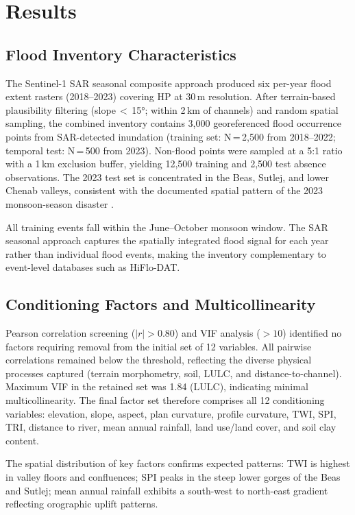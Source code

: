 \section{Results}
\label{sec:results}

\subsection{Flood Inventory Characteristics}
\label{sec:results_inventory}

The Sentinel-1 SAR seasonal composite approach produced six per-year flood extent
rasters (2018--2023) covering HP at 30\,m resolution.
After terrain-based plausibility filtering (slope\,$<$\,15°; within 2\,km of channels)
and random spatial sampling, the combined inventory contains 3,000 georeferenced
flood occurrence points from SAR-detected inundation
(training set: N\,=\,2,500 from 2018--2022; temporal test: N\,=\,500 from 2023).
Non-flood points were sampled at a 5:1 ratio with a 1\,km exclusion buffer,
yielding 12,500 training and 2,500 test absence observations.
The 2023 test set is concentrated in the Beas, Sutlej,
and lower Chenab valleys, consistent with the documented spatial pattern
of the 2023 monsoon-season disaster \citep{ndma2023}.

All training events fall within the June--October monsoon window.
The SAR seasonal approach captures the spatially integrated flood signal
for each year rather than individual flood events, making the inventory
complementary to event-level databases such as HiFlo-DAT.

\subsection{Conditioning Factors and Multicollinearity}
\label{sec:results_factors}

Pearson correlation screening ($|r| > 0.80$) and VIF analysis ($> 10$)
identified no factors requiring removal from the initial set of 12 variables.
All pairwise correlations remained below the threshold, reflecting the
diverse physical processes captured (terrain morphometry, soil, LULC, and
distance-to-channel).
Maximum VIF in the retained set was 1.84 (LULC), indicating minimal
multicollinearity.
The final factor set therefore comprises all 12 conditioning variables:
elevation, slope, aspect, plan curvature, profile curvature, TWI, SPI,
TRI, distance to river, mean annual rainfall, land use/land cover, and soil clay content.

The spatial distribution of key factors confirms expected patterns:
TWI is highest in valley floors and confluences; SPI peaks in the steep
lower gorges of the Beas and Sutlej; mean annual rainfall exhibits a
south-west to north-east gradient reflecting orographic uplift patterns.

